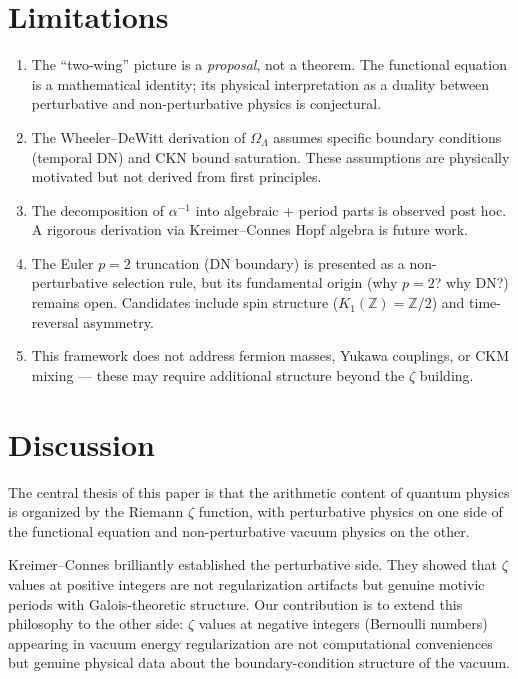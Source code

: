 \documentclass[11pt,a4paper]{article}
\begin{document}
\section{Limitations}

\begin{enumerate}
\item The ``two-wing'' picture is a \emph{proposal}, not a theorem.
The functional equation is a mathematical identity; its physical
interpretation as a duality between perturbative and
non-perturbative physics is conjectural.

\item The Wheeler--DeWitt derivation of $\Omega_\Lambda$ assumes
specific boundary conditions (temporal DN) and CKN bound
saturation. These assumptions are physically motivated but not
derived from first principles.

\item The decomposition of $\alpha^{-1}$ into algebraic + period
parts is observed post hoc. A rigorous derivation via
Kreimer--Connes Hopf algebra is future work.

\item The Euler $p = 2$ truncation (DN boundary) is presented as
a non-perturbative selection rule, but its fundamental origin
(why $p = 2$? why DN?) remains open. Candidates include spin
structure ($K_1(\mathbb{Z}) = \mathbb{Z}/2$) and time-reversal
asymmetry.

\item This framework does not address fermion masses, Yukawa
couplings, or CKM mixing --- these may require additional
structure beyond the $\zeta$ building.
\end{enumerate}

\section{Discussion}

The central thesis of this paper is that the arithmetic content
of quantum physics is organized by the Riemann $\zeta$ function,
with perturbative physics on one side of the functional equation
and non-perturbative vacuum physics on the other.

Kreimer--Connes brilliantly established the perturbative side.
They showed that $\zeta$ values at positive integers are not
regularization artifacts but genuine motivic periods with
Galois-theoretic structure. Our contribution is to extend this
philosophy to the other side: $\zeta$ values at negative integers
(Bernoulli numbers) appearing in vacuum energy regularization
are not computational conveniences but genuine physical data about
the boundary-condition structure of the vacuum.
\end{document}
